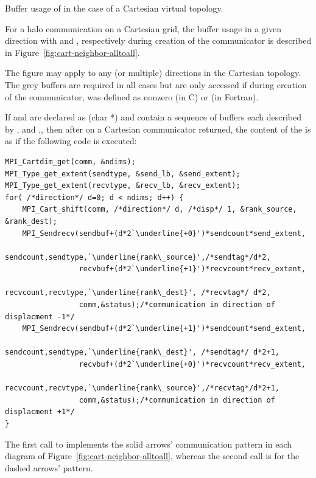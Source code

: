 \begin{example}
\label{cart-alltoall-exa}
%
%
Buffer usage of  in the case of a Cartesian virtual topology.

For a halo communication on a Cartesian grid, the buffer usage
in a given direction  with   and  , 
respectively during creation of the communicator is described
in Figure~\ref{fig:cart-neighbor-alltoall}.

The figure may apply to any (or multiple) directions in
the Cartesian topology. The grey buffers are required in all
cases but are only accessed if during creation of the communicator,
 was defined as nonzero (in C) or  (in Fortran).

If  and  are declared as \mpicode(char *) and contain a sequence of buffers
each described by , and
,, then after  on a Cartesian communicator returned, the content
of the  is as if the following code is executed:

\begin{lstlisting}[language={[MPI]C},basicstyle=\lstsmall,escapeinside=`']
MPI_Cartdim_get(comm, &ndims);
MPI_Type_get_extent(sendtype, &send_lb, &send_extent);
MPI_Type_get_extent(recvtype, &recv_lb, &recv_extent);
for( /*direction*/ d=0; d < ndims; d++) {
    MPI_Cart_shift(comm, /*direction*/ d, /*disp*/ 1, &rank_source, &rank_dest);
    MPI_Sendrecv(sendbuf+(d*2`\underline{+0}')*sendcount*send_extent,
                                 sendcount,sendtype,`\underline{rank\_source}',/*sendtag*/d*2,
                 recvbuf+(d*2`\underline{+1}')*recvcount*recv_extent,
                                 recvcount,recvtype,`\underline{rank\_dest}', /*recvtag*/ d*2,
                 comm,&status);/*communication in direction of displacment -1*/
    MPI_Sendrecv(sendbuf+(d*2`\underline{+1}')*sendcount*send_extent,
                                 sendcount,sendtype,`\underline{rank\_dest}', /*sendtag*/ d*2+1,
                 recvbuf+(d*2`\underline{+0}')*recvcount*recv_extent,
                                 recvcount,recvtype,`\underline{rank\_source}',/*recvtag*/d*2+1,
                 comm,&status);/*communication in direction of displacment +1*/
}
\end{lstlisting}

The first call to  implements the solid arrows' communication pattern
in each diagram of Figure~\ref{fig:cart-neighbor-alltoall}, whereas the second call is for
the dashed arrows' pattern.
\end{example}

